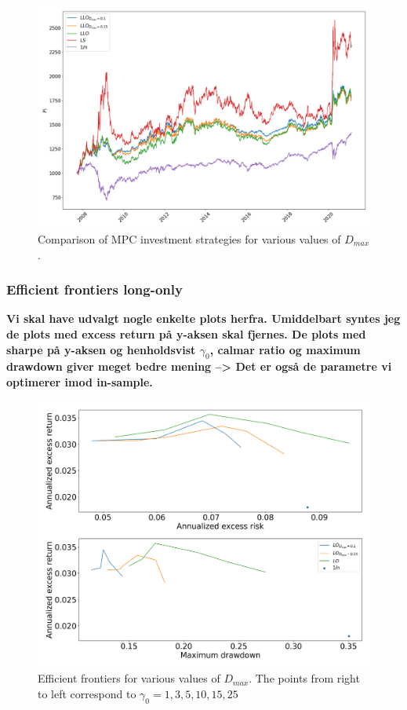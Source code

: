 \begin{figure}[H]
    \centering
    \includegraphics[width=1\textwidth]{analysis/portfolio_exercise/images/mle/port_vals_llo.png}
    \caption[Comparison of MPC investment strategies for various values of $D_{max}$]{Comparison of MPC investment strategies for various values of $D_{max}$.}
    \label{fig:MPC_port_vals_llo}
\end{figure}


\subsubsection*{Efficient frontiers long-only}

\textbf{Vi skal have udvalgt nogle enkelte plots herfra. Umiddelbart syntes jeg de plots med excess return på y-aksen skal fjernes. De plots med sharpe på y-aksen og henholdsvist $\gamma_0$, calmar ratio og maximum drawdown giver meget bedre mening --> Det er også de parametre vi optimerer imod in-sample.}

\begin{figure}[H]
    \centering
    \includegraphics[width=1\textwidth]{analysis/portfolio_exercise/images/mle/frontier_lo.png}
    \caption[Efficient frontiers for various values of $D_{max}$]{Efficient frontiers for various values of $D_{max}$. The points from right to left correspond to $\gamma_0=1,3,5,10,15,25$}
    \label{fig:MPC_frontier_lo}
\end{figure}

